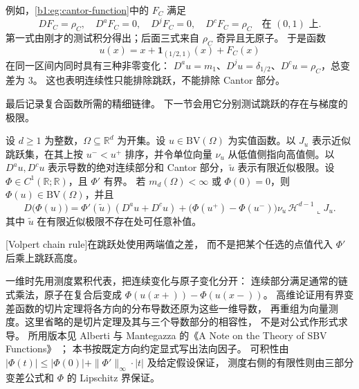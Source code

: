 例如，\cref{b1:eg:cantor-function}中的 \(F_C\) 满足
\[
 DF_C=\rho_C,\quad D^aF_C=0,\quad D^jF_C=0,\quad D^cF_C=\rho_C
 \quad\text{在 }(0,1)\text{ 上}.
\]
第一式由刚才的测试积分得出；后面三式来自 \(\rho_C\) 奇异且无原子。
于是函数
\[
 u(x)=x+\mathbf1_{(1/2,1)}(x)+F_C(x)
\]
在同一区间内同时具有三种非零变化：
\(D^au=m_1\)、\(D^ju=\delta_{1/2}\)、\(D^cu=\rho_C\)，总变差为 \(3\)。
这也表明连续性只能排除跳跃，不能排除 Cantor 部分。

\ProseParagraphBreak

最后记录复合函数所需的精细链律。
下一节会用它分别测试跳跃的存在与梯度的极限。

\begin{theorem}
\label{b1:thm:volpert-chain-rule}
设 \(d\ge1\) 为整数，\(\Omega\subseteq\mathbb R^d\) 为开集。设 \(u\in\mathrm{BV}(\Omega)\) 为实值函数。以 \(J_u\) 表示近似跳跃集，在其上按 \(u^-<u^+\) 排序，并令单位向量 \(\nu_u\) 从低值侧指向高值侧。以 \(D^au,D^cu\) 表示导数的绝对连续部分和 Cantor 部分，\(\widetilde u\) 表示有限近似极限。设 \(\Phi\in C^1(\mathbb R;\mathbb R)\)，且 \(\Phi'\) 有界。
若 \(m_d(\Omega)<\infty\) 或 \(\Phi(0)=0\)，则 \(\Phi(u)\in \mathrm{BV}(\Omega)\)，并且
\begin{equation}\label{b1:eq:volpert-chain-rule}
 D\bigl(\Phi(u)\bigr)
 =\Phi'(\widetilde u)(D^au+D^cu)
  +\bigl(\Phi(u^+)-\Phi(u^-)\bigr)\nu_u\,
    \mathcal H^{d-1}\mathbin{\llcorner}J_u.
\end{equation}
其中 \(\widetilde u\) 在有限近似极限不存在处可任意补值。
\end{theorem}
[Volpert chain rule]在跳跃处使用两端值之差，
而不是把某个任选的点值代入 \(\Phi'\) 后乘上跳跃高度。
\begin{proofsketch}
一维时先用测度累积代表，把连续变化与原子变化分开：
连续部分满足通常的链式乘法，原子在复合后变成
\(\Phi(u(x+))-\Phi(u(x-))\)。
高维论证用有界变差函数的切片定理将各方向的分布导数还原为这些一维导数，
再重组为向量测度。这里省略的是切片定理及其与三个导数部分的相容性，
不是对公式作形式求导。
所用版本见 Alberti 与 Mantegazza 的《A Note on the Theory of SBV Functions》%
\cite[Remark 2.1, equation (2.1)]{AlbertiMantegazza1997SBV}；
本书按既定方向约定显式写出法向因子。
可积性由 \(|\Phi(t)|\le|\Phi(0)|+\|\Phi'\|_\infty\cdot|t|\) 及给定假设保证，
测度右侧的有限性则由三部分变差公式和 \(\Phi\) 的 Lipschitz 界保证。
\end{proofsketch}
